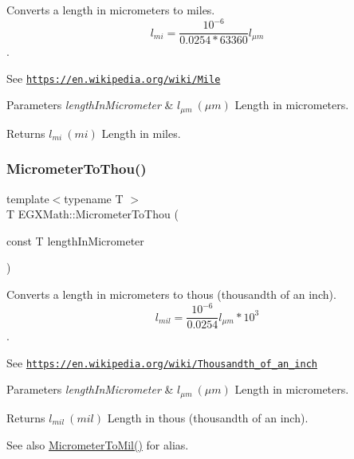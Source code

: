 Converts a length in micrometers to miles. \[ l_{mi}=\frac{10^{-6}}{0.0254 * 63360} l_{\mu m} \]. 

See \href{https://en.wikipedia.org/wiki/Mile}{\tt https\+://en.\+wikipedia.\+org/wiki/\+Mile} 
\begin{DoxyParams}{Parameters}
{\em length\+In\+Micrometer} & $ l_{\mu m}\ (\mu m)$ Length in micrometers. \\
\hline
\end{DoxyParams}
\begin{DoxyReturn}{Returns}
$ l_{mi}\ (mi)$ Length in miles. 
\end{DoxyReturn}
\mbox{\label{group___e_g_x_math-_conversions-_length_conversions-_micrometer-_imperial_ga8a2cfa132c629695ff469f66e1ab5919}} 
\subsubsection{\texorpdfstring{Micrometer\+To\+Thou()}{MicrometerToThou()}}
{\footnotesize\ttfamily template$<$typename T $>$ \\
T E\+G\+X\+Math\+::\+Micrometer\+To\+Thou (\begin{DoxyParamCaption}\item[{const T}]{length\+In\+Micrometer }\end{DoxyParamCaption})}



Converts a length in micrometers to thous (thousandth of an inch). \[ l_{mil}= \frac{10^{-6}}{0.0254} l_{\mu m} * 10^{3} \]. 

See \href{https://en.wikipedia.org/wiki/Thousandth_of_an_inch}{\tt https\+://en.\+wikipedia.\+org/wiki/\+Thousandth\+\_\+of\+\_\+an\+\_\+inch} 
\begin{DoxyParams}{Parameters}
{\em length\+In\+Micrometer} & $ l_{\mu m}\ (\mu m)$ Length in micrometers. \\
\hline
\end{DoxyParams}
\begin{DoxyReturn}{Returns}
$ l_{mil}\ (mil)$ Length in thous (thousandth of an inch). 
\end{DoxyReturn}
\begin{DoxySeeAlso}{See also}
\mbox{\hyperlink{group___e_g_x_math-_conversions-_length_conversions-_micrometer-_imperial_ga94d0f5a6ba598898a13e3a8837d7c681}{Micrometer\+To\+Mil()}} for alias. 
\end{DoxySeeAlso}
\mbox{\label{group___e_g_x_math-_conversions-_length_conversions-_micrometer-_imperial_ga3152a5a36ea33c2ab85fe275569f5ac0}} 
